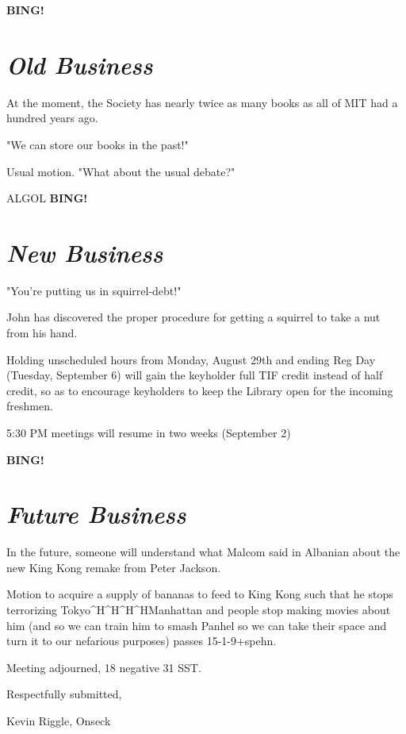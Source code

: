 \documentclass[10pt]{article}
\newcommand{\bing}{{\bf BING!} }
\newcommand{\goto}[1]{\bing \vskip 12pt \section*{{\em{#1}}}}
\begin{document}
\goto{Old Business}

At the moment, the Society has nearly twice as many books as all of MIT had a hundred years ago.

"We can store our books in the past!"

Usual motion.  "What about the usual debate?"

ALGOL
\goto{New Business}

"You're putting us in squirrel-debt!"

John has discovered the proper procedure for getting a squirrel to take a nut from his hand.

Holding unscheduled hours from Monday, August 29th and ending Reg Day (Tuesday, September 6) will 
gain the keyholder full TIF credit instead of half credit, so as to encourage keyholders to keep
the Library open for the incoming freshmen.

5:30 PM meetings will resume in two weeks (September 2) 

\goto{Future Business}

In the future, someone will understand what Malcom said in Albanian about the new King Kong
remake from Peter Jackson.

Motion to acquire a supply of bananas to feed to King Kong such that he stops terrorizing
Tokyo^H^H^H^HManhattan and people stop making movies about him (and so we can train him to
smash Panhel so we can take their space and turn it to our nefarious purposes) passes 15-1-9+spehn.

\vspace{12pt}

\noindent
Meeting adjourned, 18 negative 31 SST.

\vspace{18pt}

\centerline{Respectfully submitted,}
\centerline{Kevin Riggle, Onseck}
\end{document}
